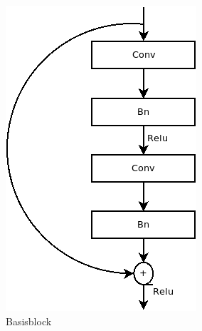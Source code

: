 \begin{figure}[h]
   \begin{minipage}[b]{.4\linewidth} %
      \includegraphics[width=0.8\linewidth]{KapitelPartB/Images/Basisblock.png}
      \caption{Basisblock}
   \end{minipage}
   \hspace{.1\linewidth}%
   \begin{minipage}[b]{.4\linewidth} %

\end{minipage}
\end{figure}

